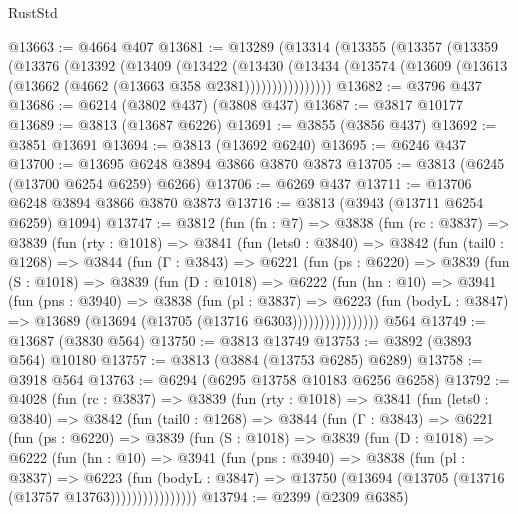 \begin{lexlean}{RustStd}
\begin{coremodule}
{\begin{coremodule}
{{{{{{{{{{{{{{{{{{{{{{{{{{{{{{{{{{{@13663 := @4664 @407
@13681 := @13289
    (@13314
      (@13355
        (@13357
          (@13359
            (@13376
              (@13392
                (@13409
                  (@13422
                    (@13430
                      (@13434
                        (@13574 (@13609 (@13613 (@13662 (@4662 (@13663 @358 @2381))))))))))))))))
@13682 := @3796 @437
@13686 := @6214 (@3802 @437) (@3808 @437)
@13687 := @3817 @10177
@13689 := @3813 (@13687 @6226)
@13691 := @3855 (@3856 @437)
@13692 := @3851 @13691
@13694 := @3813 (@13692 @6240)
@13695 := @6246 @437
@13700 := @13695 @6248 @3894 @3866 @3870 @3873
@13705 := @3813 (@6245 (@13700 @6254 @6259) @6266)
@13706 := @6269 @437
@13711 := @13706 @6248 @3894 @3866 @3870 @3873
@13716 := @3813 (@3943 (@13711 @6254 @6259) @1094)
@13747 := @3812
    (fun (fn : @7) =>
    @3838
      (fun (rc : @3837) =>
      @3839
        (fun (rty : @1018) =>
        @3841
          (fun (lets0 : @3840) =>
          @3842
            (fun (tail0 : @1268) =>
            @3844
              (fun (Γ : @3843) =>
              @6221
                (fun (ps : @6220) =>
                @3839
                  (fun (S : @1018) =>
                  @3839
                    (fun (D : @1018) =>
                    @6222
                      (fun (hn : @10) =>
                      @3941
                        (fun (pns : @3940) =>
                        @3838
                          (fun (pl : @3837) =>
                          @6223
                            (fun (bodyL : @3847) =>
                            @13689 (@13694 (@13705 (@13716 @6303))))))))))))))))
    @564
@13749 := @13687 (@3830 @564)
@13750 := @3813 @13749
@13753 := @3892 (@3893 @564) @10180
@13757 := @3813 (@3884 (@13753 @6285) @6289)
@13758 := @3918 @564
@13763 := @6294 (@6295 @13758 @10183 @6256 @6258)
@13792 := @4028
    (fun (rc : @3837) =>
    @3839
      (fun (rty : @1018) =>
      @3841
        (fun (lets0 : @3840) =>
        @3842
          (fun (tail0 : @1268) =>
          @3844
            (fun (Γ : @3843) =>
            @6221
              (fun (ps : @6220) =>
              @3839
                (fun (S : @1018) =>
                @3839
                  (fun (D : @1018) =>
                  @6222
                    (fun (hn : @10) =>
                    @3941
                      (fun (pns : @3940) =>
                      @3838
                        (fun (pl : @3837) =>
                        @6223
                          (fun (bodyL : @3847) =>
                          @13750 (@13694 (@13705 (@13716 (@13757 @13763))))))))))))))))
@13794 := @2399 (@2309 @6385)
}}}}}}}}}}}}}}}}}}}}}}}}}}}}}}}}}}}
\end{coremodule}}
\end{coremodule}
\end{lexlean}
